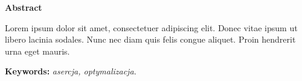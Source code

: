 \documentclass[a4paper,onecolumn,oneside,12pt]{mwrep}
\begin{document}
\vspace*{2\baselineskip}

\begin{center}
\textbf{Abstract}
\end{center}

Lorem ipsum dolor sit amet, consectetuer adipiscing elit. Donec vitae ipsum ut
libero lacinia sodales. Nunc nec diam quis felis congue aliquet. Proin hendrerit
urna eget mauris.

\vspace*{\baselineskip}

\noindent\textbf{Keywords:} \textit{asercja, optymalizacja.}

\setcounter{page}{2}

\tableofcontents







\nocite{*}

\end{document}
